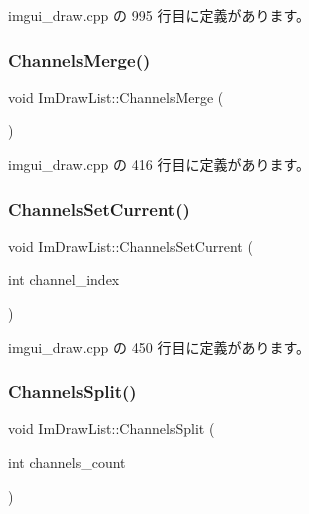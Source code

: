  imgui\+\_\+draw.\+cpp の 995 行目に定義があります。

\mbox{\label{struct_im_draw_list_a2ed82c3f663cda520c90c55b94196274}} 
\subsubsection{\texorpdfstring{Channels\+Merge()}{ChannelsMerge()}}
{\footnotesize\ttfamily void Im\+Draw\+List\+::\+Channels\+Merge (\begin{DoxyParamCaption}{ }\end{DoxyParamCaption})}



 imgui\+\_\+draw.\+cpp の 416 行目に定義があります。

\mbox{\label{struct_im_draw_list_a7de44b9fdfce65f32063ecad9306a191}} 
\subsubsection{\texorpdfstring{Channels\+Set\+Current()}{ChannelsSetCurrent()}}
{\footnotesize\ttfamily void Im\+Draw\+List\+::\+Channels\+Set\+Current (\begin{DoxyParamCaption}\item[{int}]{channel\+\_\+index }\end{DoxyParamCaption})}



 imgui\+\_\+draw.\+cpp の 450 行目に定義があります。

\mbox{\label{struct_im_draw_list_a426f124ba049bed2d38c850c65f9f917}} 
\subsubsection{\texorpdfstring{Channels\+Split()}{ChannelsSplit()}}
{\footnotesize\ttfamily void Im\+Draw\+List\+::\+Channels\+Split (\begin{DoxyParamCaption}\item[{int}]{channels\+\_\+count }\end{DoxyParamCaption})}



